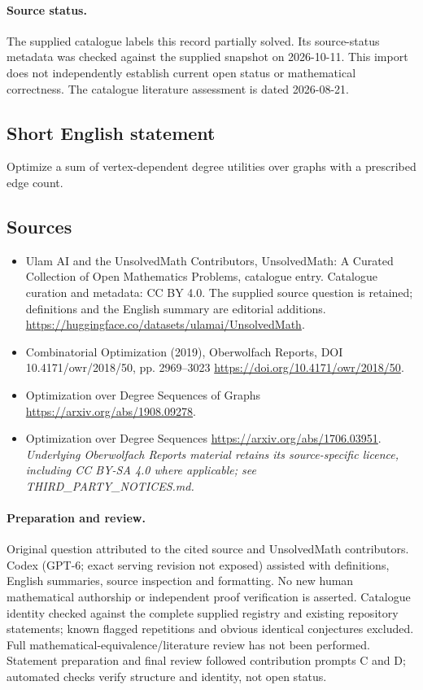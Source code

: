 \documentclass[11pt]{article}
\begin{document}
\paragraph{Source status.}
The supplied catalogue labels this record partially solved. Its source-status metadata was checked against the supplied snapshot on 2026-10-11. This import does not independently establish current open status or mathematical correctness. The catalogue literature assessment is dated 2026-08-21.
\subsection{Short English statement}
Optimize a sum of vertex-dependent degree utilities over graphs with a prescribed edge count.
\subsection{Sources}
\begin{itemize}
\item[S1] Ulam AI and the UnsolvedMath Contributors, UnsolvedMath: A Curated Collection of Open Mathematics Problems, catalogue entry. Catalogue curation and metadata: CC BY 4.0. The supplied source question is retained; definitions and the English summary are editorial additions.
\url{https://huggingface.co/datasets/ulamai/UnsolvedMath}.
\item[S2] Combinatorial Optimization (2019), Oberwolfach Reports, DOI 10.4171/owr/2018/50, pp. 2969--3023
\url{https://doi.org/10.4171/owr/2018/50}.
\item[S3] Optimization over Degree Sequences of Graphs
\url{https://arxiv.org/abs/1908.09278}.
\item[S4] Optimization over Degree Sequences
\url{https://arxiv.org/abs/1706.03951}.
\textit{Underlying Oberwolfach Reports material retains its source-specific licence, including CC BY-SA 4.0 where applicable; see THIRD\_PARTY\_NOTICES.md.}
\end{itemize}
\paragraph{Preparation and review.}
Original question attributed to the cited source and UnsolvedMath contributors. Codex (GPT-6; exact serving revision not exposed) assisted with definitions, English summaries, source inspection and formatting. No new human mathematical authorship or independent proof verification is asserted. Catalogue identity checked against the complete supplied registry and existing repository statements; known flagged repetitions and obvious identical conjectures excluded. Full mathematical-equivalence/literature review has not been performed. Statement preparation and final review followed contribution prompts C and D; automated checks verify structure and identity, not open status.
\label{end:statement}
\end{document}
